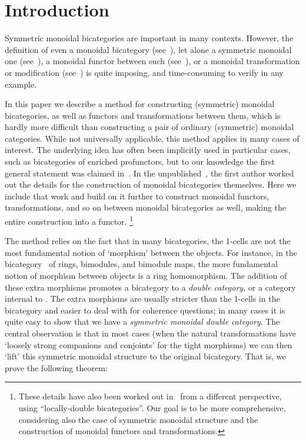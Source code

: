 \section{Introduction}
\label{sec:introduction}

Symmetric monoidal bicategories are important in many contexts.
However, the definition of even a monoidal bicategory
(see~\cite{gps:tricats,nick:tricats}), let alone a symmetric monoidal
one
(see~\cite{kv:2cat-zam,kv:bm2cat,bn:hda-i,ds:monbi-hopfagbd,crans:centers,mccrudden:bal-coalgb,gurski:brmonbicat}),
a monoidal functor between such (see~\cite{nick:tricatsbook,mccrudden:bal-coalgb}),
or a monoidal transformation or modification (see~\cite{sp:thesis})
is quite imposing, and time-consuming to verify in any example.

In this paper we describe a method for constructing (symmetric) monoidal
bicategories, as well as functors and transformations between them, which is hardly more difficult than constructing a pair
of ordinary (symmetric) monoidal categories.
While not universally applicable, this method applies in many cases of interest.
The underlying idea has often been implicitly used in particular cases, such as
bicategories of enriched profunctors, but to our knowledge the first
general statement was claimed in~\cite[Appendix B]{shulman:frbi}.
In the unpublished~\cite{shulman:smbicat}, the first author worked out the details for the construction of monoidal bicategories themselves.
Here we include that work and build on it further to construct monoidal functors, transformations, and so on between monoidal bicategories as well, making the entire construction into a functor.
\footnote{These details have also been worked out
in~\cite[\S5]{gg:ldstr-tricat} from a different perspective, using
``locally-double bicategories''.  Our goal is to be more
comprehensive, considering also the case of symmetric monoidal
structure and the construction of monoidal functors and
transformations.}

The method relies on the fact that in many bicategories, the 1-cells
are not the most fundamental notion of `morphism' between the objects.
For instance, in the bicategory \cMod\ of rings, bimodules, and
bimodule maps, the more fundamental notion of morphism between objects
is a ring homomorphism. The addition of these extra morphisms promotes
a bicategory to a \emph{double category}, or a category internal to
\cCat.  The extra morphisms are usually stricter than the 1-cells in
the bicategory and easier to deal with for coherence questions; in
many cases it is quite easy to show that we have a \emph{symmetric
  monoidal double category}.  The central observation is that in most
cases (when the natural transformations have `loosely strong companions and conjoints' for the tight morphisms) we can then `lift' this
symmetric monoidal structure to the original bicategory.  That is, we
prove the following theorem:

